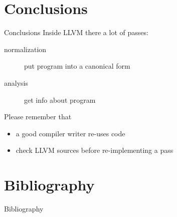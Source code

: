 \documentclass[10pt,mathserif]{beamer}
\begin{document}
\section{Conclusions}
\begin{frame}{Conclusions}
Inside LLVM there a lot of passes:

\begin{description}
\item[normalization] put program into a canonical form
\item[analysis] get info about program
\end{description}

Please remember that

\begin{itemize}
\item a good compiler writer \alert{re-uses} code
\item check LLVM sources before re-implementing a pass
\end{itemize}
\end{frame}

\section{Bibliography}
\begin{frame}[allowframebreaks]{Bibliography}
\nocite{*}


\end{frame}
\end{document}
